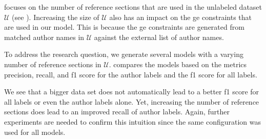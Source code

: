 \bigskip

 focuses on the number of reference sections that are used in the unlabeled dataset $\mathcal{U}$ (see ).
Increasing the size of $\mathcal{U}$ also has an impact on the \gls{ge} constraints that are used in our model.
This is because the \gls{ge} constraints are generated from matched author names in $\mathcal{U}$ against the external list of author names.

To address the research question, we generate several models with a varying number of reference sections in $\mathcal{U}$.
 compares the models based on the metrics \gls{precision}, \gls{recall}, and \gls{f1 score} for the author labels and the \gls{f1 score} for all labels.
\begin{table}[t]
\hspace{-0.25\textwidth}
\caption{Comparison of models that use different numbers of reference sections for the model learning.}
\label{tab:eval-training-size}
\end{table}
We see that a bigger data set does not automatically lead to a better \gls{f1 score} for all labels or even the author labels alone.
Yet, increasing the number of reference sections does lead to an improved \gls{recall} of author labels.
Again, further experiments are needed to confirm this intuition since the same configuration was used for all models.


